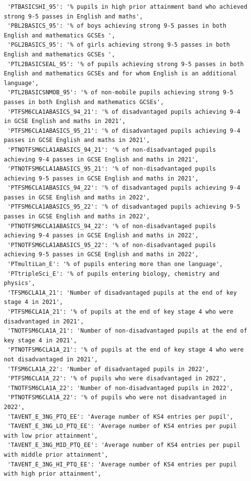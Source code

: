 \documentclass[
  letterpaper,
  DIV=11,
  numbers=noendperiod]{scrartcl}
\begin{document}
\begin{verbatim}
 'PTBASICSHI_95': '% pupils in high prior attainment band who achieved strong 9-5 passes in English and maths',
 'PBL2BASICS_95': '% of boys achieving strong 9-5 passes in both English and mathematics GCSEs ',
 'PGL2BASICS_95': '% of girls achieving strong 9-5 passes in both English and mathematics GCSEs ',
 'PTL2BASICSEAL_95': '% of pupils achieving strong 9-5 passes in both English and mathematics GCSEs and for whom English is an additional language',
 'PTL2BASICSNMOB_95': '% of non-mobile pupils achieving strong 9-5 passes in both English and mathematics GCSEs',
 'PTFSM6CLA1ABASICS_94_21': '% of disadvantaged pupils achieving 9-4 in GCSE English and maths in 2021',
 'PTFSM6CLA1ABASICS_95_21': '% of disadvantaged pupils achieving 9-4 passes in GCSE English and maths in 2021',
 'PTNOTFSM6CLA1ABASICS_94_21': '% of non-disadvantaged pupils achieving 9-4 passes in GCSE English and maths in 2021',
 'PTNOTFSM6CLA1ABASICS_95_21': '% of non-disadvantaged pupils achieving 9-5 passes in GCSE English and maths in 2021',
 'PTFSM6CLA1ABASICS_94_22': '% of disadvantaged pupils achieving 9-4 passes in GCSE English and maths in 2022',
 'PTFSM6CLA1ABASICS_95_22': '% of disadvantaged pupils achieving 9-5 passes in GCSE English and maths in 2022',
 'PTNOTFSM6CLA1ABASICS_94_22': '% of non-disadvantaged pupils achieving 9-4 passes in GCSE English and maths in 2022',
 'PTNOTFSM6CLA1ABASICS_95_22': '% of non-disadvantaged pupils achieving 9-5 passes in GCSE English and maths in 2022',
 'PTmultiLan_E': '% of pupils entering more than one language',
 'PTtripleSci_E': '% of pupils entering biology, chemistry and physics',
 'TFSM6CLA1A_21': 'Number of disadvantaged pupils at the end of key stage 4 in 2021',
 'PTFSM6CLA1A_21': '% of pupils at the end of key stage 4 who were disadvantaged in 2021',
 'TNOTFSM6CLA1A_21': 'Number of non-disadvantaged pupils at the end of key stage 4 in 2021',
 'PTNOTFSM6CLA1A_21': '% of pupils at the end of key stage 4 who were not disadvantaged in 2021',
 'TFSM6CLA1A_22': 'Number of disadvantaged pupils in 2022',
 'PTFSM6CLA1A_22': '% of pupils who were disadvantaged in 2022',
 'TNOTFSM6CLA1A_22': 'Number of non-disadvantaged pupils in 2022',
 'PTNOTFSM6CLA1A_22': '% of pupils who were not disadvantaged in 2022',
 'TAVENT_E_3NG_PTQ_EE': 'Average number of KS4 entries per pupil',
 'TAVENT_E_3NG_LO_PTQ_EE': 'Average number of KS4 entries per pupil with low prior attainment',
 'TAVENT_E_3NG_MID_PTQ_EE': 'Average number of KS4 entries per pupil with middle prior attainment',
 'TAVENT_E_3NG_HI_PTQ_EE': 'Average number of KS4 entries per pupil with high prior attainment',

\end{verbatim}
\end{document}
